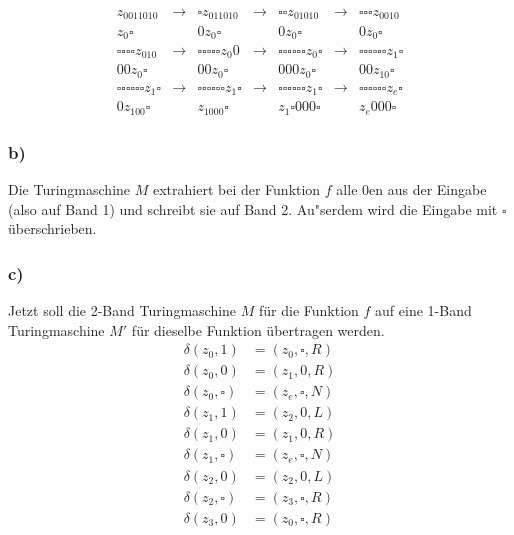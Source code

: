 \documentclass[a4paper,12pt]{article}
\begin{document}
	\begin{align*}
		z_0011010 &\rightarrow &\square z_011010 &\rightarrow &\square \square z_01010 &\rightarrow & \square \square \square z_0010\\
		z_0 \square &  &0 z_0 \square & &0 z_0 \square & &0 z_0 \square\\
		\square \square \square \square z_010 &\rightarrow &\square \square \square \square \square z_0 0 &\rightarrow &\square \square \square \square \square \square z_0 \square &\rightarrow & \square \square \square \square \square \square z_1 \square\\
		00 z_0 \square &  &00 z_0 \square & &000 z_0 \square & &00 z_10 \square\\
		\square \square \square \square  \square \square z_1 \square &\rightarrow &\square \square \square \square  \square \square z_1 \square &\rightarrow &\square \square \square \square \square \square z_1 \square &\rightarrow & \square \square \square \square \square \square z_e \square\\
		0 z_100 \square &  &z_1000 \square & &z_1 \square 000 \square & &z_e000 \square
	\end{align*}
	\subsubsection*{b)}
	Die Turingmaschine $M$ extrahiert bei der Funktion $f$ alle $0$en aus der Eingabe (also auf Band 1) und schreibt sie auf Band 2. Au"serdem wird die Eingabe mit $\square$ überschrieben.
	
	\subsubsection*{c)}
	Jetzt soll die 2-Band Turingmaschine $M$ für die Funktion $f$ auf eine 1-Band Turingmaschine $M'$ für dieselbe Funktion übertragen werden.
	\begin{align*}
		\delta \left( z_0,1\right) &= \left( z_0, \square, R\right)\\
		\delta \left( z_0,0\right) &= \left( z_1, 0, R\right)\\
		\delta \left( z_0,\square\right) &= \left( z_e, \square, N\right)\\
		\delta \left( z_1,1\right) &= \left( z_2, 0, L\right)\\
		\delta \left( z_1,0\right) &= \left( z_1, 0, R\right)\\
		\delta \left( z_1,\square\right) &= \left( z_e, \square, N\right)\\
		\delta \left( z_2,0\right) &= \left( z_2, 0, L\right)\\
		\delta \left( z_2,\square\right) &= \left( z_3, \square, R\right)\\
		\delta \left( z_3,0\right) &= \left( z_0, \square, R\right)
	\end{align*}
	\newpage
\end{document}
